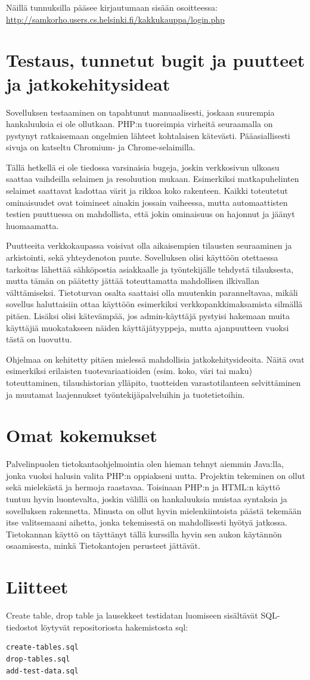 \documentclass[a4paper,12pt, titlepage]{article}
\begin{document}
\noindent
Näillä tunnuksilla pääsee kirjautumaan sisään osoitteessa: \\
\url{http://samkorho.users.cs.helsinki.fi/kakkukauppa/login.php}

\section{Testaus, tunnetut bugit ja puutteet ja jatkokehitysideat}
Sovelluksen testaaminen on tapahtunut manuaalisesti, joskaan suurempia hankaluuksia ei ole ollutkaan. PHP:n tuoreimpia virheitä seuraamalla on pystynyt ratkaisemaan ongelmien lähteet kohtalaisen kätevästi. Pääasiallisesti sivuja on katseltu Chromium- ja Chrome-selaimilla.

Tällä hetkellä ei ole tiedossa varsinaisia bugeja, joskin verkkosivun ulkoasu saattaa vaihdeilla selaimen ja resoluution mukaan. Esimerkiksi matkapuhelinten selaimet saattavat kadottaa värit ja rikkoa koko rakenteen. Kaikki toteutetut ominaisuudet ovat toimineet ainakin jossain vaiheessa, mutta automaattisten testien puuttuessa on mahdollista, että jokin ominaisuus on hajonnut ja jäänyt huomaamatta.

Puutteeita verkkokaupassa voisivat olla aikaisempien tilausten seuraaminen ja arkistointi, sekä yhteydenoton puute. Sovelluksen olisi käyttöön otettaessa tarkoitus lähettää sähköpostia asiakkaalle ja työntekijälle tehdystä tilauksesta, mutta tämän on päätetty jättää toteuttamatta mahdollisen ilkivallan välttämiseksi. Tietoturvan osalta saattaisi olla muutenkin paranneltavaa, mikäli sovellus haluttaisiin ottaa käyttöön esimerkiksi verkkopankkimaksamista silmällä pitäen. Lisäksi olisi kätevämpää, jos admin-käyttäjä pystyisi hakemaan muita käyttäjiä muokatakseen näiden käyttäjätyyppeja, mutta ajanpuutteen vuoksi tästä on luovuttu.

Ohjelmaa on kehitetty pitäen mielessä mahdollisia jatkokehitysideoita. Näitä ovat esimerkiksi erilaisten tuotevariaatioiden (esim. koko, väri tai maku) toteuttaminen, tilaushistorian ylläpito, tuotteiden varastotilanteen selvittäminen ja muutamat laajennukset työntekijäpalveluihin ja tuotetietoihin. 

\section{Omat kokemukset}
Palvelinpuolen tietokantaohjelmointia olen hieman tehnyt aiemmin Java:lla, jonka vuoksi halusin valita PHP:n oppiakseni uutta. Projektin tekeminen on ollut sekä mielekästä ja hermoja raastavaa. Toisinaan PHP:n ja HTML:n käyttö tuntuu hyvin luontevalta, joskin välillä on hankaluuksia muistaa syntaksia ja sovelluksen rakennetta. Minusta on ollut hyvin mielenkiintoista päästä tekemään itse valitsemaani aihetta, jonka tekemisestä on mahdollisesti hyötyä jatkossa. Tietokannan käyttö on täyttänyt tällä kurssilla hyvin sen aukon käytännön osaamisesta, minkä Tietokantojen perusteet jättävät.

\section{Liitteet}
Create table, drop table ja lausekkeet testidatan luomiseen sisältävät SQL-tiedostot löytyvät repositoriosta hakemistosta sql:
\begin{verbatim}
create-tables.sql
drop-tables.sql
add-test-data.sql
\end{verbatim}
\end{document}
